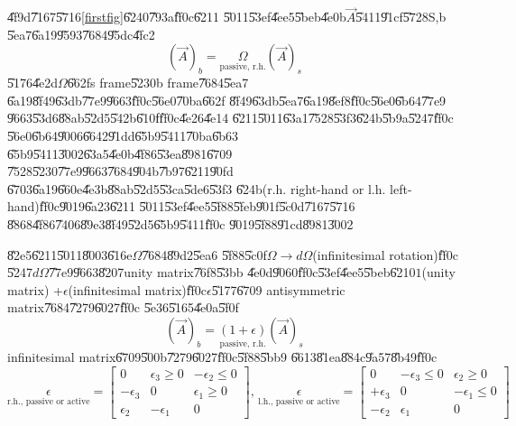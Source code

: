 \documentclass[12pt,a4paper]{article}
\begin{document}
\U{4f9d}\U{7167}\U{5716}\ref{firstfig}\U{6240}\U{793a}\U{ff0c}\U{6211}%
\U{5011}\U{53ef}\U{4ee5}\U{5beb}\U{4e0b}$\vec{A}$\U{5411}\U{91cf}\U{5728}S,b%
\U{5ea7}\U{6a19}\U{9593}\U{7684}\U{95dc}\U{4fc2}%
\begin{equation*}
\left( \vec{A}\right) _{b}=\underset{\text{passive, r.h.}}{\Omega }\left( 
\vec{A}\right) _{s}
\end{equation*}%
\U{5176}\U{4e2d}$\Omega $\U{662f}s frame\U{5230}b frame\U{7684}\U{5ea7}%
\U{6a19}\U{8f49}\U{63db}\U{77e9}\U{9663}\U{ff0c}\U{56e0}\U{70ba}\U{662f}%
\U{8f49}\U{63db}\U{5ea7}\U{6a19}\U{8ef8}\U{ff0c}\U{56e0}\U{6b64}\U{77e9}%
\U{9663}\U{53d6}\U{88ab}\U{52d5}\U{542b}\U{610f}\U{ff0c}\U{4e26}\U{4e14}%
\U{6211}\U{5011}\U{63a1}\U{7528}\U{53f3}\U{624b}\U{5b9a}\U{5247}\U{ff0c}%
\U{56e0}\U{6b64}\U{9006}\U{6642}\U{91dd}\U{65b9}\U{5411}\U{70ba}\U{6b63}%
\U{65b9}\U{5411}\U{3002}\U{63a5}\U{4e0b}\U{4f86}\U{53ea}\U{8981}\U{6709}%
\U{7528}\U{5230}\U{77e9}\U{9663}\U{7684}\U{904b}\U{7b97}\U{6211}\U{90fd}%
\U{6703}\U{6a19}\U{660e}\U{4e3b}\U{88ab}\U{52d5}\U{53ca}\U{5de6}\U{53f3}%
\U{624b}(r.h. right-hand or l.h. left-hand)\U{ff0c}\U{9019}\U{6a23}\U{6211}%
\U{5011}\U{53ef}\U{4ee5}\U{5f88}\U{5feb}\U{901f}\U{5c0d}\U{7167}\U{5716}%
\U{8868}\U{4f86}\U{7406}\U{89e3}\U{8f49}\U{52d5}\U{65b9}\U{5411}\U{ff0c}%
\U{9019}\U{5f88}\U{91cd}\U{8981}\U{3002}

\U{82e5}\U{6211}\U{5011}\U{8003}\U{616e}$\Omega $\U{7684}\U{89d2}\U{5ea6}%
\U{5f88}\U{5c0f}$\Omega \rightarrow d\Omega $(infinitesimal rotation)\U{ff0c}%
\U{5247}$d\Omega $\U{77e9}\U{9663}\U{8207}unity matrix\U{76f8}\U{53bb}%
\U{4e0d}\U{9060}\U{ff0c}\U{53ef}\U{4ee5}\U{5beb}\U{6210}$1$(unity matrix) +$%
\epsilon $(infinitesimal matrix)\U{ff0c}$\epsilon $\U{5177}\U{6709}%
antisymmetric matrix\U{7684}\U{7279}\U{6027}\cite[p. 169]{goldstein}\U{ff0c}%
\U{5e36}\U{5165}\U{4e0a}\U{5f0f}%
\begin{equation*}
\left( \vec{A}\right) _{b}=\underset{\text{passive, r.h.}}{\left( 1+\epsilon
\right) }\left( \vec{A}\right) _{s}
\end{equation*}%
infinitesimal matrix\U{6709}\U{500b}\U{7279}\U{6027}\U{ff0c}\U{5f88}\U{5bb9}%
\U{6613}\U{81ea}\U{884c}\U{9a57}\U{8b49}\U{ff0c}%
\begin{equation*}
\underset{\text{r.h., passive or active}}{\epsilon }=\left[ 
\begin{array}{ccc}
0 & \epsilon _{3}\geq 0 & -\epsilon _{2}\leq 0 \\ 
-\epsilon _{3} & 0 & \epsilon _{1}\geq 0 \\ 
\epsilon _{2} & -\epsilon _{1} & 0%
\end{array}%
\right] \text{, }\underset{\text{l.h., passive or active}}{\epsilon }=\left[ 
\begin{array}{ccc}
0 & -\epsilon _{3}\leq 0 & \epsilon _{2}\geq 0 \\ 
+\epsilon _{3} & 0 & -\epsilon _{1}\leq 0 \\ 
-\epsilon _{2} & \epsilon _{1} & 0%
\end{array}%
\right]
\end{equation*}
\end{document}
